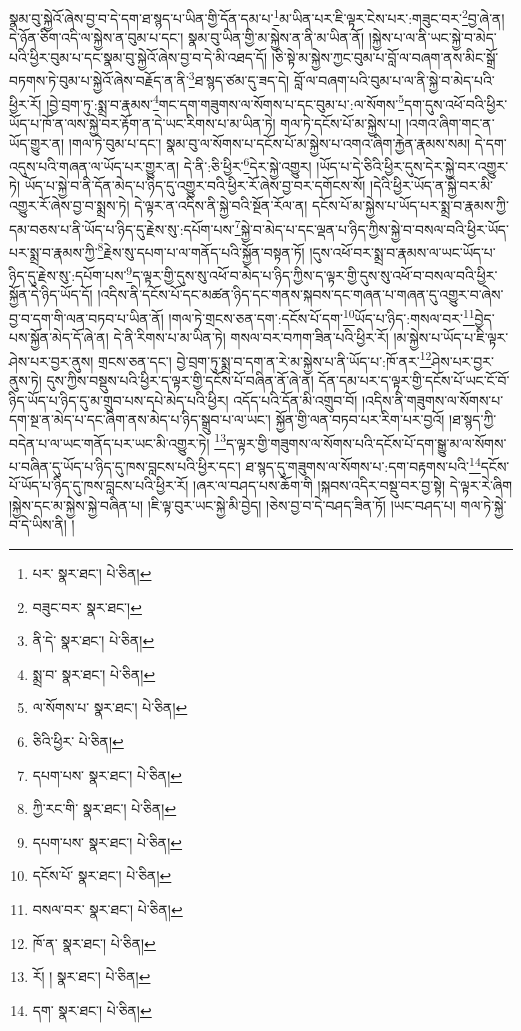 སྣམ་བུ་སྐྱེའོ་ཞེས་བྱ་བ་དེ་དག་ཐ་སྙད་པ་ཡིན་གྱི་དོན་དམ་པ་\footnote{པར་  སྣར་ཐང་།  པེ་ཅིན། }མ་ཡིན་པར་ཇི་ལྟར་ངེས་པར་:གཟུང་བར་\footnote{བཟུང་བར་  སྣར་ཐང་། }བྱ་ཞེ་ན། དེ་ཉོན་ཅིག་འདི་ལ་སྐྱེས་ན་བུམ་པ་དང་། སྣམ་བུ་ཡིན་གྱི་མ་སྐྱེས་ན་ནི་མ་ཡིན་ནོ། །སྐྱེས་པ་ལ་ནི་ཡང་སྐྱེ་བ་མེད་པའི་ཕྱིར་བུམ་པ་དང་སྣམ་བུ་སྐྱེའོ་ཞེས་བྱ་བ་དེ་མི་འཐད་དོ། །ཅི་སྟེ་མ་སྐྱེས་ཀྱང་བུམ་པ་བློ་ལ་བཞག་ནས་མིང་སྒྲོ་བཏགས་ཏེ་བུམ་པ་སྐྱེའོ་ཞེས་བརྗོད་ན་ནི་\footnote{ནི་དེ་  སྣར་ཐང་།  པེ་ཅིན། }ཐ་སྙད་ཙམ་དུ་ཟད་དེ། བློ་ལ་བཞག་པའི་བུམ་པ་ལ་ནི་སྐྱེ་བ་མེད་པའི་ཕྱིར་རོ། །བྱེ་བྲག་ཏུ་:སྨྲ་བ་རྣམས་\footnote{སྨྲ་བ་  སྣར་ཐང་།  པེ་ཅིན། }གང་དག་གཟུགས་ལ་སོགས་པ་དང་བུམ་པ་:ལ་སོགས་\footnote{ལ་སོགས་པ་  སྣར་ཐང་།  པེ་ཅིན། }དག་དུས་འཕོ་བའི་ཕྱིར་ཡོད་པ་ཁོ་ན་ལས་སྐྱེ་བར་རྟོག་ན་དེ་ཡང་རིགས་པ་མ་ཡིན་ཏེ། གལ་ཏེ་དངོས་པོ་མ་སྐྱེས་པ། །འགའ་ཞིག་གང་ན་ཡོད་གྱུར་ན། །གལ་ཏེ་བུམ་པ་དང་། སྣམ་བུ་ལ་སོགས་པ་དངོས་པོ་མ་སྐྱེས་པ་འགའ་ཞིག་རྐྱེན་རྣམས་སམ། དེ་དག་འདུས་པའི་གཞན་ལ་ཡོད་པར་གྱུར་ན། དེ་ནི་:ཅི་ཕྱིར་\footnote{ཅིའི་ཕྱིར་  པེ་ཅིན། }དེར་སྐྱེ་འགྱུར། །ཡོད་པ་དེ་ཅིའི་ཕྱིར་དུས་དེར་སྐྱེ་བར་འགྱུར་ཏེ། ཡོད་པ་སྐྱེ་བ་ནི་དོན་མེད་པ་ཉིད་དུ་འགྱུར་བའི་ཕྱིར་རོ་ཞེས་བྱ་བར་དགོངས་སོ། །དེའི་ཕྱིར་ཡོད་ན་སྐྱེ་བར་མི་འགྱུར་རོ་ཞེས་བྱ་བ་སྨྲས་ཏེ། དེ་ལྟར་ན་འདིས་ནི་སྐྱེ་བའི་སྔོན་རོལ་ན། དངོས་པོ་མ་སྐྱེས་པ་ཡོད་པར་སྨྲ་བ་རྣམས་ཀྱི་དམ་བཅས་པ་ནི་ཡོད་པ་ཉིད་དུ་རྗེས་སུ་:དཔོག་པས་\footnote{དཔག་པས་  སྣར་ཐང་།  པེ་ཅིན། }སྐྱེ་བ་མེད་པ་དང་ལྡན་པ་ཉིད་ཀྱིས་སྐྱེ་བ་བསལ་བའི་ཕྱིར་ཡོད་པར་སྨྲ་བ་རྣམས་ཀྱི་\footnote{ཀྱི་རང་གི་  སྣར་ཐང་།  པེ་ཅིན། }རྗེས་སུ་དཔག་པ་ལ་གནོད་པའི་སྐྱོན་བསྟན་ཏོ། །དུས་འཕོ་བར་སྨྲ་བ་རྣམས་ལ་ཡང་ཡོད་པ་ཉིད་དུ་རྗེས་སུ་:དཔོག་པས་\footnote{དཔག་པས་  སྣར་ཐང་།  པེ་ཅིན། }ད་ལྟར་གྱི་དུས་སུ་འཕོ་བ་མེད་པ་ཉིད་ཀྱིས་ད་ལྟར་གྱི་དུས་སུ་འཕོ་བ་བསལ་བའི་ཕྱིར་སྐྱོན་དེ་ཉིད་ཡོད་དོ། །འདིས་ནི་དངོས་པོ་དང་མཚན་ཉིད་དང་གནས་སྐབས་དང་གཞན་པ་གཞན་དུ་འགྱུར་བ་ཞེས་བྱ་བ་དག་གི་ལན་བཏབ་པ་ཡིན་ནོ། །གལ་ཏེ་གྲངས་ཅན་དག་:དངོས་པོ་དག་\footnote{དངོས་པོ་  སྣར་ཐང་།  པེ་ཅིན། }ཡོད་པ་ཉིད་:གསལ་བར་\footnote{བསལ་བར་  སྣར་ཐང་།  པེ་ཅིན། }བྱེད་པས་སྐྱོན་མེད་དོ་ཞེ་ན། དེ་ནི་རིགས་པ་མ་ཡིན་ཏེ། གསལ་བར་བཀག་ཟིན་པའི་ཕྱིར་རོ། །མ་སྐྱེས་པ་ཡོད་པ་ཇི་ལྟར་ཤེས་པར་བྱར་ནུས། གྲངས་ཅན་དང་། བྱེ་བྲག་ཏུ་སྨྲ་བ་དག་ན་རེ་མ་སྐྱེས་པ་ནི་ཡོད་པ་:ཁོ་ནར་\footnote{ཁོ་ན་  སྣར་ཐང་།  པེ་ཅིན། }ཤེས་པར་བྱར་ནུས་ཏེ། དུས་ཀྱིས་བསྡུས་པའི་ཕྱིར་ད་ལྟར་གྱི་དངོས་པོ་བཞིན་ནོ་ཞེ་ན། དོན་དམ་པར་ད་ལྟར་གྱི་དངོས་པོ་ཡང་ངོ་བོ་ཉིད་ཡོད་པ་ཉིད་དུ་མ་གྲུབ་པས་དཔེ་མེད་པའི་ཕྱིར། འདོད་པའི་དོན་མི་འགྲུབ་བོ། །འདིས་ནི་གཟུགས་ལ་སོགས་པ་དག་སྔ་ན་མེད་པ་དང་ཞིག་ནས་མེད་པ་ཉིད་སྒྲུབ་པ་ལ་ཡང་། སྐྱོན་གྱི་ལན་བཏབ་པར་རིག་པར་བྱའོ། །ཐ་སྙད་ཀྱི་བདེན་པ་ལ་ཡང་གནོད་པར་ཡང་མི་འགྱུར་ཏེ། \footnote{རོ། །   སྣར་ཐང་།  པེ་ཅིན། }ད་ལྟར་གྱི་གཟུགས་ལ་སོགས་པའི་དངོས་པོ་དག་སྒྱུ་མ་ལ་སོགས་པ་བཞིན་དུ་ཡོད་པ་ཉིད་དུ་ཁས་བླངས་པའི་ཕྱིར་དང་། ཐ་སྙད་དུ་གཟུགས་ལ་སོགས་པ་:དག་བརྟགས་པའི་\footnote{དག་  སྣར་ཐང་།  པེ་ཅིན། }དངོས་པོ་ཡོད་པ་ཉིད་དུ་ཁས་བླངས་པའི་ཕྱིར་རོ། །ཞར་ལ་བཤད་པས་ཆོག་གི །སྐབས་འདིར་བསྡུ་བར་བྱ་སྟེ། དེ་ལྟར་རེ་ཞིག །སྐྱེས་དང་མ་སྐྱེས་སྐྱེ་བཞིན་པ། །ཇི་ལྟ་བུར་ཡང་སྐྱེ་མི་བྱེད། །ཅེས་བྱ་བ་དེ་བཤད་ཟིན་ཏོ། །ཡང་བཤད་པ། གལ་ཏེ་སྐྱེ་བ་དེ་ཡིས་ནི། །
